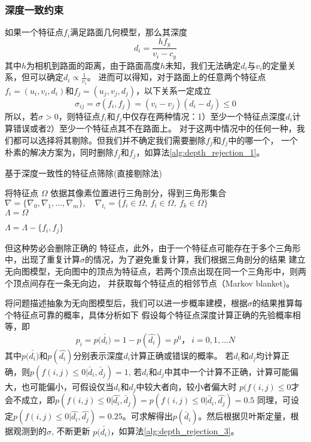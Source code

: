 \subsubsection{深度一致约束}
\label{sec:mvosr_depthcon}
如果一个特征点$f_i$满足路面几何模型，那么其深度
\begin{equation}
    d_i = \frac{hf_y}{v_i-c_y}
\end{equation}
其中$h$为相机到路面的距离，由于路面高度$h$未知，我们无法确定$d_i$与$v_i$的定量关系，但可以确定$d_i\propto \frac{1}{v_i}$。
进而可以得知，对于路面上的任意两个特征点$f_i = (u_i,v_i,d_i)$和$f_j=(u_j,v_j,d_j)$，以下关系一定成立
\begin{equation}
    \sigma_{ij}=\sigma(f_i,f_j)= (v_i - v_j)(d_i-d_j)\leq 0
\end{equation}
所以，若$\sigma > 0$，则特征点$f_i$和$f_j$中仅存在两种情况：1）至少一个特征点深度$d_i$计算错误或者2）至少一个特征点其不在路面上。
对于这两中情况中的任何一种，我们都可以选择将其剔除。但我们并不确定我们需要删除$f_j$和$f_j$中的哪一个，
一个朴素的解决方案为，同时删除$f_j$和$f_j$，如算法\ref{alg:depth_rejection_1}。
\begin{algorithm}
    \caption{基于深度一致性的特征点筛除(直接剔除法)}
    将特征点 $\Omega$ 依据其像素位置进行三角剖分，得到三角形集合$\nabla =\{\nabla_0,\nabla_1,...,\nabla_m\},\quad \nabla_{t_i}=\{f_i\in\Omega,\ f_i\in\Omega,\ f_k\in\Omega\}$\\
    $\Lambda = \Omega$\\
    {   
        {
            {
                $\Lambda = \Lambda - \{f_i,f_j\}$
            }
        }

    }
  \label{alg:depth_rejection_1}
\end{algorithm}
但这种势必会删除正确的
特征点，此外，由于一个特征点可能存在于多个三角形中，出现了重复计算$\sigma$的情况，为了避免重复计算，我们根据三角剖分的结果
建立无向图模型，无向图中的顶点为特征点，若两个顶点出现在同一个三角形中，则两个顶点间存在一条无向边，
并获取每个特征点的相邻节点（Markov blanket)。

将问题描述抽象为无向图模型后，我们可以进一步概率建模，根据$\sigma$的结果推算每个特征点可靠的概率，具体分析如下
假设每个特征点深度计算正确的先验概率相等，即
\begin{equation}
    p_i  = p(\check{d_i)} = 1- p(\hat{d_i}) = p^0，\ i=0,1,...N
\end{equation}
其中$p(\check{d_i)}$和$p(\hat{d_i})$分别表示深度$d_i$计算正确或错误的概率。
若$d_i$和$d_j$均计算正确，则$p(f(i,j)\leq 0|\check{d_i},\check{d_j})=1$, 
若$d_i$和$d_j$中其中一个计算不正确，计算可能偏大，也可能偏小，可假设仅当$d_i$和$d_j$中较大者向，较小者偏大时
$p(f(i,j)\leq 0$才会不成立，即$p(f(i,j)\leq 0|\hat{d_i},\check{d_j})=p(f(i,j)\leq 0|\check{d_i},\hat{d_j})=0.5$
同理，可设定$p(f(i,j)\leq 0|\hat{d_i},\hat{d_j})=0.25$。可求解得出$p(\check{d_i})$。然后根据贝叶斯定量，根据观测到的$\sigma$,
不断更新 $p(\check{d_i)}$，如算法\ref{alg:depth_rejection_3}。


